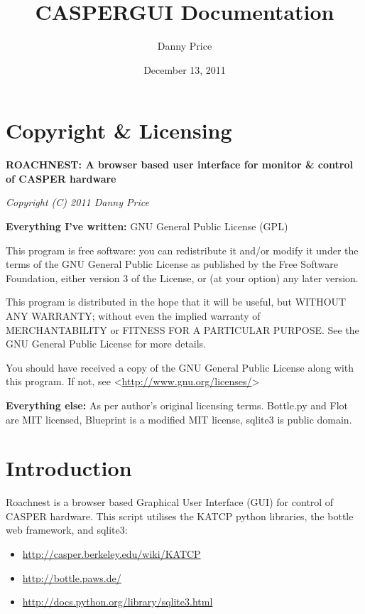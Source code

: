 \documentclass[letterpaper,10pt,english]{sphinxmanual}
\title{CASPERGUI Documentation}
\date{December 13, 2011}
\author{Danny Price}
\begin{document}
\maketitle
\tableofcontents
{}\label{index::doc}



\chapter{Copyright \& Licensing}
\label{index:roachnest-documentation}\label{index:copyright-licensing}
\textbf{ROACHNEST: A browser based user interface for monitor \& control of CASPER hardware}

\emph{Copyright (C) 2011  Danny Price}

\textbf{Everything I've written:} GNU General Public License (GPL)

This program is free software: you can redistribute it and/or modify
it under the terms of the GNU General Public License as published by
the Free Software Foundation, either version 3 of the License, or
(at your option) any later version.

This program is distributed in the hope that it will be useful,
but WITHOUT ANY WARRANTY; without even the implied warranty of
MERCHANTABILITY or FITNESS FOR A PARTICULAR PURPOSE.  See the
GNU General Public License for more details.

You should have received a copy of the GNU General Public License
along with this program.  If not, see \textless{}\href{http://www.gnu.org/licenses/}{http://www.gnu.org/licenses/}\textgreater{}

\textbf{Everything else:} As per author's original licensing terms.
Bottle.py and Flot are MIT licensed, Blueprint is a modified MIT license,
sqlite3 is public domain.


\chapter{Introduction}
\label{index:introduction}
Roachnest is a browser based Graphical User Interface (GUI) for control of CASPER hardware.
This script utilises the KATCP python libraries, the bottle web framework, and sqlite3:
\begin{itemize}
\item {} 
\href{http://casper.berkeley.edu/wiki/KATCP}{http://casper.berkeley.edu/wiki/KATCP}

\item {} 
\href{http://bottle.paws.de/}{http://bottle.paws.de/}

\item {} 
\href{http://docs.python.org/library/sqlite3.html}{http://docs.python.org/library/sqlite3.html}

\end{itemize}
\end{document}
